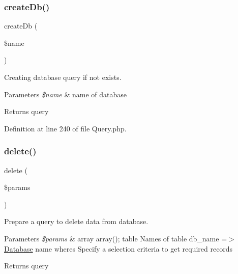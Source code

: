 \subsubsection{\texorpdfstring{create\+Db()}{createDb()}}
{\footnotesize\ttfamily create\+Db (\begin{DoxyParamCaption}\item[{}]{\$name }\end{DoxyParamCaption})}

Creating database query if not exists.


\begin{DoxyParams}{Parameters}
{\em \$name} & name of database\\
\hline
\end{DoxyParams}
\begin{DoxyReturn}{Returns}
query 
\end{DoxyReturn}


Definition at line 240 of file Query.\+php.

\mbox{\label{class_zest_1_1_database_1_1_query_1_1_query_a2fb5b35138aabdbcdbabde07ff1df4b6}} 
\subsubsection{\texorpdfstring{delete()}{delete()}}
{\footnotesize\ttfamily delete (\begin{DoxyParamCaption}\item[{}]{\$params }\end{DoxyParamCaption})}

Prepare a query to delete data from database.


\begin{DoxyParams}{Parameters}
{\em \$params} & array array(); \textquotesingle{}table\textquotesingle{} Names of table \textquotesingle{}db\+\_\+name\textquotesingle{} =$>$ \mbox{\hyperlink{namespace_zest_1_1_database}{Database}} name \textquotesingle{}wheres\textquotesingle{} Specify a selection criteria to get required records\\
\hline
\end{DoxyParams}
\begin{DoxyReturn}{Returns}
query 
\end{DoxyReturn}


